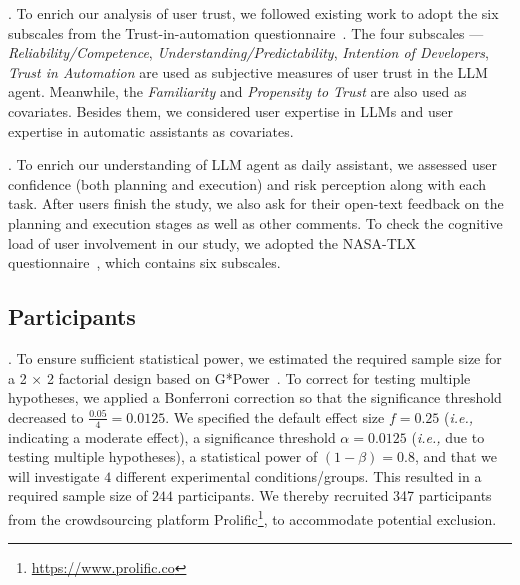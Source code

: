 . To enrich our analysis of user trust, we followed existing work to adopt the six subscales from the Trust-in-automation questionnaire~\cite{korber2019theoretical}. 
The four subscales --- \textit{Reliability/Competence},  \textit{Understanding/Predictability},  \textit{Intention of Developers},  \textit{Trust in Automation} are used as subjective measures of user trust in the LLM agent. 
Meanwhile, the \textit{Familiarity} and \textit{Propensity to Trust} are also used as covariates. Besides them, we considered user expertise in LLMs and user expertise in automatic assistants as covariates. 

. To enrich our understanding of LLM agent as daily assistant, we assessed user confidence (both planning and execution) and risk perception along with each task. 
After users finish the study, we also ask for their open-text feedback on the planning and execution stages as well as other comments. 
To check the cognitive load of user involvement in our study, we adopted the NASA-TLX questionnaire~\cite{colligan2015cognitive}, which contains six subscales.


\subsection{Participants}

. 
To ensure sufficient statistical power, we estimated the required sample size for a 2 × 2 factorial design based on G*Power~\cite{faul2009statistical}. 
{To correct for testing multiple hypotheses, we applied a Bonferroni correction so that the significance threshold decreased to $\frac{0.05}{4}=0.0125$.} 
We specified the default effect size $f = 0.25$
(\textit{i.e.,} indicating a moderate effect), a significance threshold $\alpha = 0.0125$ (\textit{i.e.,} due to testing multiple hypotheses), a statistical power of $(1 - \beta) = 0.8$, and that we will investigate $4$ different experimental conditions/groups. 
This resulted in a required sample size of $244$ participants. 
We thereby recruited 347 participants from the crowdsourcing platform Prolific\footnote{\url{https://www.prolific.co}}, to accommodate potential exclusion.

